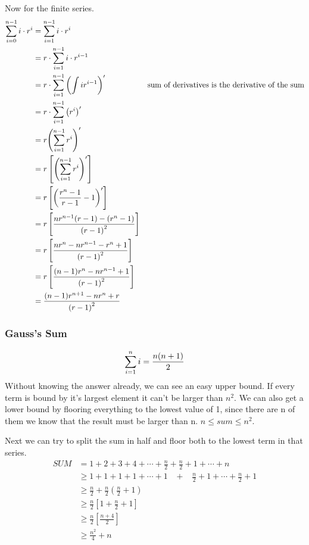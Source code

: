 \documentclass[english, 10pt]{article}
\begin{document}
Now for the finite series.
\begin{align*}
    \sum_{i=0}^{n-1}i\cdot r^{i} &= \sum_{i=1}^{n-1}i\cdot r^{i} \\
    &= r\cdot\sum_{i=1}^{n-1}i\cdot r^{i-1} \\
    &= r\cdot\sum_{i=1}^{n-1}{\left( \int ir^{i-1} \right)}^{\prime} & \text{sum of derivatives is the derivative of the sum}\\
    &= r\cdot\sum_{i=1}^{n-1}{\left( r^i \right)}^{\prime} \\
    &= r{\left(\sum_{i=1}^{n-1} r^i \right)}^{\prime} \\
    &= r\left[{\left(\sum_{i=1}^{n-1} r^i \right)}^{\prime}\right] \\
    &= r\left[{\left(\frac{r^n-1}{r-1}-1 \right)}^{\prime}\right] \\
    &= r\left[ \frac{nr^{n-1}(r-1)-(r^n-1)}{{(r-1)}^2} \right] \\
    &= r\left[ \frac{nr^n-nr^{n-1}-r^n+1}{{(r-1)}^2} \right] \\
    &= r\left[ \frac{(n-1)r^n-nr^{n-1}+1}{{(r-1)}^2} \right] \\
    &= \frac{(n-1)r^{n+1}-nr^{n}+r}{{(r-1)}^2} \\
\end{align*}

\subsubsection{Gauss's Sum}
$$\sum_{i=1}^{n} i = \frac{n(n+1)}{2} $$ Without knowing the answer already, we can
see an easy upper bound. If every term is bound by it's largest element it
can't be larger than $n^2$. We can also get a lower bound by flooring everything
to the lowest value of 1, since there are n of them we know that the result must
be larger than n. $ n \le sum\le n^2 $.

Next we can try to split the sum in half and floor both to the lowest term in that series.
\begin{align*}
    SUM &= 1+2+3+4+\cdots +\frac{n}{2} + \frac{n}{2}+1+ \cdots +n \\
    &\ge 1+1+1+1+ \cdots +1 \;\;\; + \;\;\; \frac{n}{2}+1 + \cdots + \frac{n}{2}+1 \\
    &\ge \frac{n}{2} + \frac{n}{2}\left( \frac{n}{2}+1 \right) \\
    &\ge \frac{n}{2}\left[ 1+ \frac{n}{2}+1 \right] \\
    &\ge \frac{n}{2}\left[ \frac{n+4}{2} \right] \\
    &\ge \frac{n^2}{4} +n \\
\end{align*}
\end{document}

